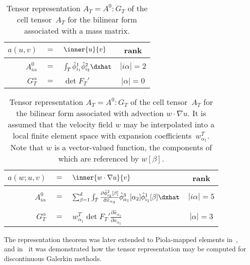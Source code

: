 \begin{table}[!b]
\vspace*{4pt}
  \centering
  \begin{tabular}{rclc}
    \toprule
    $a(u, v)$ &$=$& $\inner{u}{v}$ & rank \\
    \midrule
    &&&\\[-2ex]
    $A^0_{i\alpha}$ &$=$& $\int_{\hat{T}} \hat{\phi}_{i_1}^{1} \hat{\phi}_{i_2}^{2} \dxhat$
    & $|i\alpha| = 2$ \\[1ex]
    &&&\\[-2ex]
    $G_T^{\alpha}$ &$=$& $\det F_T'$
    & $|\alpha| = 0$ \\[1ex]
    \bottomrule
  \end{tabular}
  \caption{Tensor representation $A_T = A^0 : G_T$ of the cell
    tensor~$A_T$ for the bilinear form associated with a mass
    matrix.}\label{tab:mass}\vspace*{10pt}
\end{table}

\begin{table}[!b]
  \centering
  \begin{tabular}{rclc}
    \toprule
    $a(w; u, v)$ &$=$& $\inner{w \cdot \nabla u}{v}$ & rank \\
    \midrule
    &&&\\[-2ex]
    $A^0_{i\alpha}$ &$=$&
    $\sum_{\beta=1}^d
    \int_{\hat{T}}
    \frac{\partial \hat{\phi}^2_{i_2}[\beta]}{\partial \hat{x}_{\alpha_3}}
    \hat{\phi}^3_{\alpha_1}[\alpha_2]
    \hat{\phi}^1_{i_1}[\beta]
    \dxhat$
    & $|i\alpha| = 5$ \\[1ex]
    &&&\\[-2ex]
    $G_T^{\alpha}$ &$=$&
    $w^T_{\alpha_1} \det F_T'
    \frac{\partial \hat{x}_{\alpha_3}}{\partial x_{\alpha_2}}$
    & $|\alpha| = 3$ \\[1ex]
    \bottomrule
  \end{tabular}
  \caption{Tensor representation $A_T = A^0 : G_T$ of the cell
      tensor~$A_T$ for the bilinear form associated with advection $w
      \cdot \nabla u$. It is assumed that the velocity field $w$ may
      be interpolated into a local finite element space with expansion
      coefficients~$w^T_{\alpha_1}$. Note that $w$ is a vector-valued
      function, the components of which are referenced by $w[\beta]$.}
  \label{tab:advection}
\end{table}

The representation theorem was later extended to Piola-mapped elements
in~\citet{RognesKirbyLogg2009}, and in~\citet{OelgaardLoggWells2008}
it was demonstrated how the tensor representation may be computed for
discontinuous Galerkin methods.

